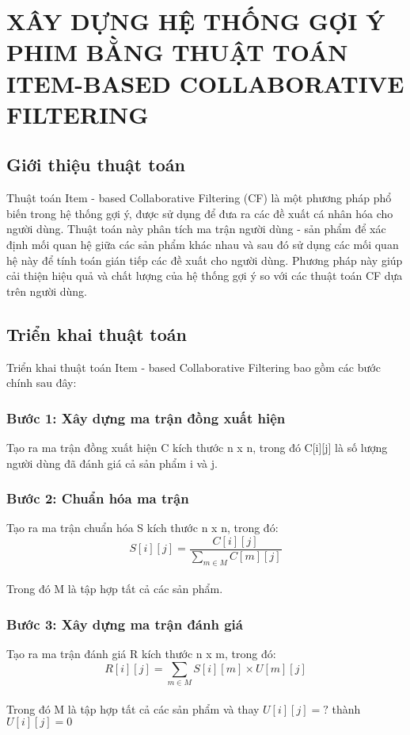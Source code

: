 \chapter[XÂY DỰNG HỆ THỐNG GỢI Ý PHIM BẰNG THUẬT TOÁN ITEM-BASED COLLABORATIVE FILTERING]
 {\LARGE XÂY DỰNG HỆ THỐNG GỢI Ý PHIM BẰNG THUẬT TOÁN ITEM-BASED COLLABORATIVE FILTERING}

\section{Giới thiệu thuật toán}
Thuật toán Item - based Collaborative Filtering (CF) là một phương pháp
phổ biến trong hệ thống gợi ý, được sử dụng để đưa ra các đề xuất cá nhân
hóa cho người dùng.
\vspace{0.5cm}
\newline
Thuật toán này phân tích ma trận người dùng - sản phẩm
để xác định mối quan hệ giữa các sản phẩm khác nhau và sau đó sử dụng các
mối quan hệ này để tính toán gián tiếp các đề xuất cho người dùng.
\vspace{0.5cm}
\newline
Phương pháp này giúp cải thiện hiệu quả và chất lượng của hệ thống
gợi ý so với các thuật toán CF dựa trên người dùng.

\section{Triển khai thuật toán}
Triển khai thuật toán Item - based Collaborative Filtering
bao gồm các bước chính sau đây:

\subsection*{Bước 1: Xây dựng ma trận đồng xuất hiện}
Tạo ra ma trận đồng xuất hiện C kích thước n x n, trong đó
C[i][j] là số lượng người dùng đã đánh giá cả sản phẩm i và j.

\subsection*{Bước 2: Chuẩn hóa ma trận}
Tạo ra ma trận chuẩn hóa S kích thước n x n, trong đó: \\
$$S[i][j] = \frac{C[i][j]}{\sum_{m \in M}C[m][j]}$$ \\
Trong đó M là tập hợp tất cả các sản phẩm.

\subsection*{Bước 3: Xây dựng ma trận đánh giá}
Tạo ra ma trận đánh giá R kích thước n x m, trong đó: \\
$$R[i][j] = \sum_{m \in M}S[i][m] \times U[m][j]$$ \\
Trong đó M là tập hợp tất cả các sản phẩm và thay $U[i][j]=?$ thành $U[i][j]=0$

